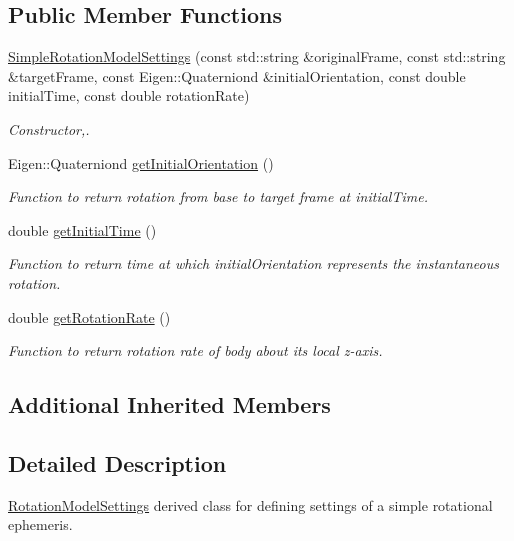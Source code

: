 \subsection*{Public Member Functions}
\begin{DoxyCompactItemize}
\item 
\hyperlink{classtudat_1_1simulation__setup_1_1SimpleRotationModelSettings_ac8fb3ae21881c731770b2f8d05bcf597}{Simple\+Rotation\+Model\+Settings} (const std\+::string \&original\+Frame, const std\+::string \&target\+Frame, const Eigen\+::\+Quaterniond \&initial\+Orientation, const double initial\+Time, const double rotation\+Rate)
\begin{DoxyCompactList}\small\item\em Constructor,. \end{DoxyCompactList}\item 
Eigen\+::\+Quaterniond \hyperlink{classtudat_1_1simulation__setup_1_1SimpleRotationModelSettings_a31c5840518e55a6ecee234c3bfd89f8b}{get\+Initial\+Orientation} ()
\begin{DoxyCompactList}\small\item\em Function to return rotation from base to target frame at initial\+Time. \end{DoxyCompactList}\item 
double \hyperlink{classtudat_1_1simulation__setup_1_1SimpleRotationModelSettings_a2d1a99e19c5dd5b555a9f40ce0d589a1}{get\+Initial\+Time} ()
\begin{DoxyCompactList}\small\item\em Function to return time at which initial\+Orientation represents the instantaneous rotation. \end{DoxyCompactList}\item 
double \hyperlink{classtudat_1_1simulation__setup_1_1SimpleRotationModelSettings_a088dd04ba7de4e857144b8c15c59ba6d}{get\+Rotation\+Rate} ()
\begin{DoxyCompactList}\small\item\em Function to return rotation rate of body about its local z-\/axis. \end{DoxyCompactList}\end{DoxyCompactItemize}
\subsection*{Additional Inherited Members}


\subsection{Detailed Description}
\hyperlink{classtudat_1_1simulation__setup_1_1RotationModelSettings}{Rotation\+Model\+Settings} derived class for defining settings of a simple rotational ephemeris. 

